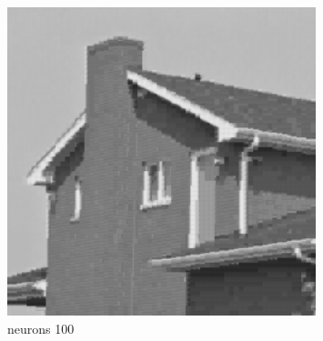 \documentclass[../IDP_Task5_Karwowski_Kowalewski.tex]{subfiles}
\begin{document}
{{        \begin{figure}[!htbp]
            \begin{minipage}[c]{0.45\linewidth}
                \centering
                \includegraphics[width=0.8\textwidth]{img/kowalewski/crop_size_4_neurons_100.png}
                \caption{neurons 100}
            \end{minipage}\hfill
        \end{figure}

}}
\end{document}
